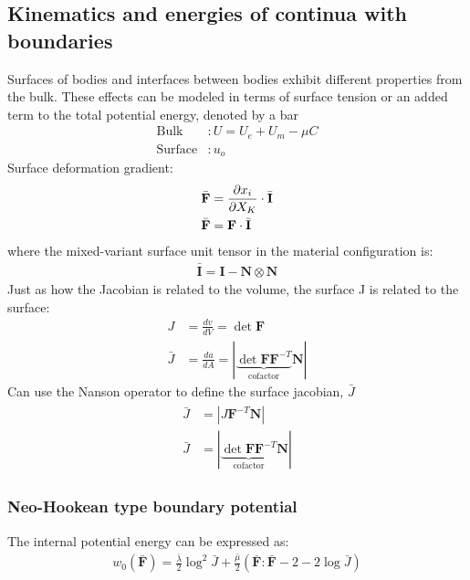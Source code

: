 \documentclass[12pt,3p]{article}
\numberwithin{equation}{section}
\begin{document}
\subsection{Kinematics and energies of continua with boundaries}
Surfaces of bodies and interfaces between bodies exhibit different properties from the bulk. These effects can be modeled in terms of surface tension or an added term to the total potential energy, denoted by a bar 
\begin{align*} 
\text{Bulk}&: U = U_e + U_m - \mu C \\
\text{Surface}&: u_o
\end{align*}
Surface deformation gradient:
\begin{align}\label{deformationSurface}
\begin{split}
\bar{\mathbf{F}} &= \pdv{x_i}{X_K} \cdot \bar{\mathbf{I}} \\
\bar{\mathbf{F}} &= \mathbf{F} \cdot \bar{\mathbf{I}}
\end{split}
\end{align}
where the mixed-variant surface unit tensor in the material configuration is:
\begin{align}\label{surfaceUnitTensor}
\bar{\mathbf{I}} = \mathbf{I} - \mathbf{N} \otimes \mathbf{N}
\end{align}
Just as how the Jacobian is related to the volume, the surface J is related to the surface: 
\begin{align*}
J &= \frac{dv}{dV} = \det \mathbf{F} \\
\bar{J} &= \frac{da}{dA} = | \underbrace{\det \mathbf{F} \mathbf{F}^{-T}}_\text{cofactor} \mathbf{N} | 
\end{align*}
Can use the Nanson operator to define the surface jacobian, $\bar{J}$
\begin{align}\label{surfaceJacobian}
\begin{split}
\bar{J} &= | J \mathbf{F}^{-T} \mathbf{N} | \\
\bar{J} &= | \underbrace{\det \mathbf{F} \mathbf{F}^{-T}}_\text{cofactor} \mathbf{N} | 
\end{split}	   
\end{align}

\subsubsection{Neo-Hookean type boundary potential}
The internal potential energy can be expressed as: 
\begin{align}\label{neoHookeanPotEnergy}
w_0 (\mathbf{\bar{F}}) = \frac{\bar{\lambda}}{2} \log^2 \bar{J} + \frac{\bar{\mu}}{2} (\mathbf{\bar{F}} : \mathbf{\bar{F}} - 2 - 2 \log \bar{J})
\end{align}
\end{document}
